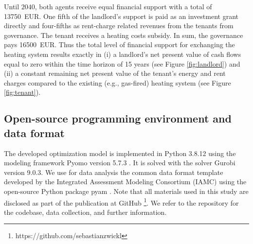 Until $2040$, both agents receive equal financial support with a total of \SI{13750}{EUR}. One fifth of the landlord's support is paid as an investment grant directly and four-fifths as rent-charge related revenues from the tenants from governance. The tenant receives a heating costs subsidy. In sum, the governance pays \SI{16500}{EUR}. Thus the total level of financial support for exchanging the heating system results exactly in (i) a landlord's net present value of cash flows equal to zero within the time horizon of 15 years (see Figure \ref{fig:landlord}) and (ii) a constant remaining net present value of the tenant's energy and rent charges compared to the existing (e.g., gas-fired) heating system (see Figure \ref{fig:tenant}). 

\subsection{Open-source programming environment and data format}\label{met:os}
The developed optimization model is implemented in Python 3.8.12 using the modeling framework Pyomo version 5.7.3 \cite{hart2017optimization}. It is solved with the solver Gurobi version 9.0.3. We use for data analysis the common data format template developed by the Integrated Assessment Modeling Consortium (IAMC) using the open-source Python package pyam \cite{huppmann2021pyam}. Note that all materials used in this study are disclosed as part of the publication at GitHub \footnote{https://github.com/sebastianzwickl}. We refer to the repository for the codebase, data collection, and further information. 